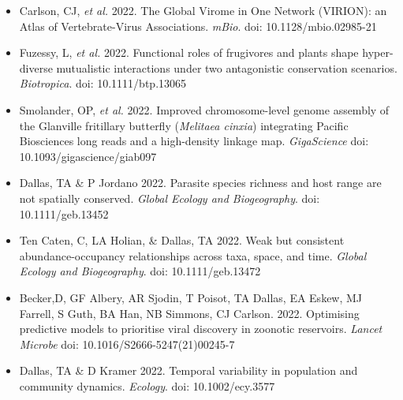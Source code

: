 \documentclass[]{CV}
\begin{document}
\begin{itemize}

\item Carlson, CJ, \textit{et al.} 2022.  The Global Virome in One Network (VIRION): an Atlas of Vertebrate-Virus Associations. \textit{mBio}. doi: 10.1128/mbio.02985-21

\item Fuzessy, L, \textit{et al.} 2022.  Functional roles of frugivores and plants shape hyper-diverse mutualistic interactions under two antagonistic conservation scenarios. \textit{Biotropica}. doi: 10.1111/btp.13065

\item Smolander, OP, \textit{et al.} 2022. Improved chromosome-level genome assembly of the Glanville fritillary butterfly (\textit{Melitaea cinxia}) integrating Pacific Biosciences long reads and a high-density linkage map. \textit{GigaScience} doi: 10.1093/gigascience/giab097

\item {\mefont Dallas, TA} \& P Jordano 2022. Parasite species richness and host range are not spatially conserved. \textit{Global Ecology and Biogeography}. doi: 10.1111/geb.13452

\item Ten Caten, C, LA Holian, \& {\mefont Dallas, TA} 2022. Weak but consistent abundance-occupancy relationships across taxa, space, and time. \textit{Global Ecology and Biogeography}. doi: 10.1111/geb.13472

\item Becker,D, GF Albery, AR Sjodin, T Poisot, {\mefont TA Dallas}, EA Eskew, MJ Farrell, S Guth, BA Han, NB Simmons, CJ Carlson. 2022. Optimising predictive models to prioritise viral discovery in
zoonotic reservoirs. \textit{Lancet Microbe} doi: 10.1016/S2666-5247(21)00245-7

\item {\mefont Dallas, TA} \& D Kramer 2022. Temporal variability in population and community dynamics. \textit{Ecology}. doi: 10.1002/ecy.3577


\end{itemize}






{}
\end{document}
